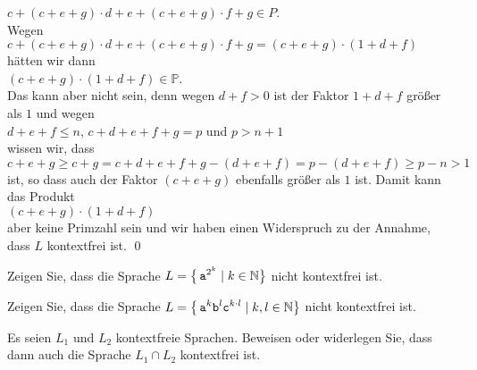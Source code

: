 $c + (c + e + g) \cdot d + e + (c + e + g) \cdot f + g \in P$.
\\
Wegen
\\
\hspace*{1.3cm}
$c + (c + e + g) \cdot d + e + (c + e + g) \cdot f + g = (c + e + g) \cdot (1 + d + f)$ 
\\[0.2cm]
h\"atten wir dann
\\[0.2cm]
\hspace*{1.3cm}
$(c + e + g) \cdot (1 + d + f) \in \mathbb{P}$.
\\[0.2cm]
Das kann aber nicht sein, denn wegen $d + f > 0$ ist der Faktor $1 + d + f$ gr\"o{\ss}er als $1$
und wegen
\\[0.2cm]
\hspace*{1.3cm}
 $d + e + f \leq n$, \quad $c + d + e + f + g = p$ \quad und \quad $p > n + 1$ 
\\[0.2cm]
wissen wir, dass 
\\[0.2cm]
\hspace*{1.3cm}
$c + e + g \geq  c + g = c + d + e + f + g - (d + e + f) = p - (d + e + f) \geq p - n > 1$ 
\\[0.2cm]
ist, so dass auch der Faktor $(c + e + g)$ ebenfalls gr\"o{\ss}er als $1$ ist.  Damit kann das
Produkt
\\[0.2cm]
\hspace*{1.3cm}
$(c + e + g) \cdot (1 + d + f)$ 
\\[0.2cm]
aber keine Primzahl sein und wir haben einen
Widerspruch zu der Annahme, dass $L$ kontextfrei ist.
\qed


\exercise
Zeigen Sie, dass die Sprache
$\displaystyle L = \bigl\{ \,\mathtt{a}^{2^k} \mid k \in \mathbb{N} \bigr\}$
nicht kontextfrei ist.  \eox

\exercise
Zeigen Sie, dass die Sprache
$\displaystyle L = \bigl\{ \,\mathtt{a}^{k}\mathtt{b}^l\mathtt{c}^{k \cdot l} \mid k, l \in \mathbb{N} \bigr\}$
nicht kontextfrei ist.  \eox

\exercise
Es seien $L_1$ und $L_2$ kontextfreie Sprachen.  Beweisen oder widerlegen Sie, dass dann auch die
Sprache $L_1 \cap L_2$ kontextfrei ist.  \eox


